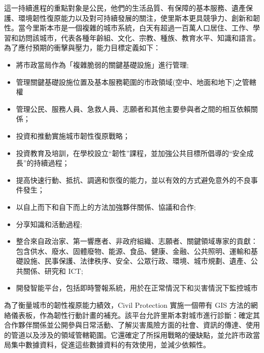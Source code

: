 \documentclass[a4paper,12pt]{article}
\begin{document}
\begin{enumerate}
\begin{enumerate}
這一持續進程的重點對象是公民，他們的生活品質、有保障的基本服務、遺產保護、環境韌性復原能力以及對可持續發展的關注，使里斯本更具競爭力、創新和韌性。當今里斯本市是一個複雜的城市系統，白天有超過一百萬人口居住、工作、學習和訪問該城市，代表各種年齡組、文化、宗教、種族、教育水平、知識和語言。為了應付預期的衝擊與壓力，能力目標定義如下：\\
\begin{itemize}
\item 將市政當局作為「複雜脆弱的關鍵基礎設施」進行管理;\\
\item 管理關鍵基礎設施位置及基本服務範圍的市政領域(空中、地面和地下)之管轄權\\
\item 管理公民、服務人員、急救人員、志願者和其他主要參與者之間的相互依賴關係；\\
\item 投資和推動實施城市韌性復原戰略；\\
\item 投資教育及培訓，在學校設立“韌性”課程，並加強公共目標所倡導的“安全成長”的持續過程；\\
\item 提高快速行動、抵抗、調適和恢復的能力，並以有效的方式避免意外的不良事件發生；\\
\item 以自上而下和自下而上的方法加強夥伴關係、協議和合作;\\
\item 分享知識和活動過程;\\
\item 整合來自政治家、第一響應者、非政府組織、志願者、關鍵領域專家的貢獻：包含供水、廢水、固體廢物、能源、食品、健康、金融、公共照明、運輸和基礎設施、民事保護、法律秩序、安全、公眾行政、環境、城市規劃、遺產、公共關係、研究和 ICT;\\
\item 開發智能平台，包括即時警報系統，用於在正常情況下和災害情況下監控城市\\
\end{itemize}

為了衡量城市的韌性複原能力績效，Civil Protection 實施一個帶有 GIS 方法的網絡儀表板，作為韌性行動計畫的補充。該平台允許里斯本對城市進行診斷：確定其合作夥伴關係並公開參與日常活動、了解災害風險方面的社會、資訊的傳達、使用的管道以及涉及的領域管轄範圍。它還確定了所採用戰略的優缺點，並允許市政當局集中數據資料，促進這些數據資料的有效使用，並減少依賴性。\\


\end{enumerate}
\end{enumerate}
\end{document}
